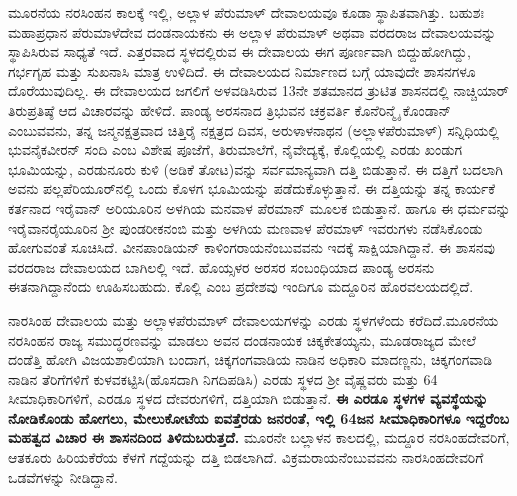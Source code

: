 ಮೂರನೆಯ ನರಸಿಂಹನ ಕಾಲಕ್ಕೆ ಇಲ್ಲಿ, ಅಲ್ಲಾಳ ಪೆರುಮಾಳ್​ ದೇವಾಲಯವೂ ಕೂಡಾ ಸ್ಥಾಪಿತವಾಗಿತ್ತು. ಬಹುಶಃ ಮಹಾಪ್ರಧಾನ ಪೆರುಮಾಳೆದೇವ ದಂಡನಾಯಕನು ಈ ಅಲ್ಲಾಳ ಪೆರುಮಾಳ್​ ಅಥವಾ ವರದರಾಜ ದೇವಾಲಯವನ್ನು ಸ್ಥಾಪಿಸಿರುವ ಸಾಧ್ಯತೆ ಇದೆ. ಎತ್ತರವಾದ ಸ್ಥಳದಲ್ಲಿರುವ ಈ ದೇವಾಲಯ ಈಗ ಪೂರ್ಣವಾಗಿ ಬಿದ್ದುಹೋಗಿದ್ದು, ಗರ್ಭಗೃಹ ಮತ್ತು ಸುಖನಾಸಿ ಮಾತ್ರ ಉಳಿದಿದೆ. ಈ ದೇವಾಲಯದ ನಿರ್ಮಾಣದ ಬಗ್ಗೆ ಯಾವುದೇ ಶಾಸನಗಳೂ ದೊರೆಯುವುದಿಲ್ಲ. ಈ ದೇವಾಲಯದ ಜಗಲಿಗೆ ಅಳವಡಿಸಿರುವ 13ನೇ ಶತಮಾನದ ತ್ರುಟಿತ ಶಾಸನದಲ್ಲಿ ನಾಚ್ಚಿಯಾರ್​ ತಿರುಪ್ರತಿಷ್ಠೆ ಆದ ವಿಚಾರವನ್ನು ಹೇಳಿದೆ. ಪಾಂಡ್ಯ ಅರಸನಾದ ತ್ರಿಭುವನ ಚಕ್ರವರ್ತಿ ಕೊನೆರಿನ್ಮೈ ಕೊಂಡಾನ್​ ಎಂಬುವವನು, ತನ್ನ ಜನ್ಮನಕ್ಷತ್ರವಾದ ಚಿತ್ತಿರೈ ನಕ್ಷತ್ರದ ದಿವಸ, ಅರುಳಾಳನಾಥನ (ಅಲ್ಲಾಳಪೆರುಮಾಳ್​) ಸನ್ನಿಧಿಯಲ್ಲಿ ಭುವನೈಕವೀರನ್​ ಸಂದಿ ಎಂಬ ವಿಶೇಷ ಪೂಜೆಗೆ, ತಿರುಮಾಲೆಗೆ, ನೈವೇದ್ಯಕ್ಕೆ, ಕೊಲ್ಲಿಯಲ್ಲಿ ಎರಡು ಖಂಡುಗ ಭೂಮಿಯನ್ನು, ಎರಡುನೂರು ಕುಳಿ (ಅಡಿಕೆ ತೋಟ)ವನ್ನು ಸರ್ವಮಾನ್ಯವಾಗಿ ದತ್ತಿ ಬಿಡುತ್ತಾನೆ. ಈ ದತ್ತಿಗೆ ಬದಲಾಗಿ ಅವನು ಪಲ್ಲಪೆರಿಯೂರ್​ನಲ್ಲಿ ಒಂದು ಕೊಳಗ ಭೂಮಿಯನ್ನು ಪಡೆದುಕೊಳ್ಳುತ್ತಾನೆ. ಈ ದತ್ತಿಯನ್ನು ತನ್ನ ಕಾರ್ಯಕೆ ಕರ್ತನಾದ ಇರೈವಾನ್​ ಅರಿಯೂರಿನ ಅಳಗಿಯ ಮನವಾಳ ಪೆರಮಾನ್​ ಮೂಲಕ ಬಿಡುತ್ತಾನೆ. ಹಾಗೂ ಈ ಧರ್ಮವನ್ನು ಇರೈವಾನರೈಯೂರಿನ ಶ‍್ರೀ ಪುಂಡರೀಕನಂಬಿ ಮತ್ತು ಅಳಗಿಯ ಮಣವಾಳ ಪೆರಮಾಳ್​ ಇವರುಗಳು ನಡೆಸಿಕೊಂಡು ಹೋಗುವಂತೆ ಸೂಚಿಸಿದೆ. ವೀನಪಾಂಡಿಯನ್​ ಕಾಳಿಂಗರಾಯನೆಂಬುವವನು ಇದಕ್ಕೆ ಸಾಕ್ಷಿಯಾಗಿದ್ದಾನೆ. ಈ ಶಾಸನವು ವರದರಾಜ ದೇವಾಲಯದ ಬಾಗಿಲಲ್ಲಿ ಇದೆ. ಹೊಯ್ಸಳರ ಅರಸರ ಸಂಬಂಧಿಯಾದ ಪಾಂಡ್ಯ ಅರಸನು ಈತನಾಗಿದ್ದಾನೆಂದು ಊಹಿಸಬಹುದು. ಕೊಲ್ಲಿ ಎಂಬ ಪ್ರದೇಶವು ಇಂದಿಗೂ ಮದ್ದೂರಿನ ಹೊರವಲಯ\-ದಲ್ಲಿದೆ.

\vskip -2pt

ನಾರಸಿಂಹ ದೇವಾಲಯ ಮತ್ತು ಅಲ್ಲಾಳಪೆರುಮಾಳ್​ ದೇವಾಲಯಗಳನ್ನು ಎರಡು ಸ್ಥಳಗಳೆಂದು ಕರೆದಿದೆ.\break ಮೂರನೆಯ ನರಸಿಂಹನ ರಾಜ್ಯ ಸಮುದ್ಧರಣವನ್ನು ಮಾಡಲು ಅವನ ದಂಡನಾಯಕ ಚಿಕ್ಕಕೇತಯ್ಯನು, ಮೂಡರಾಜ್ಯದ ಮೇಲೆ ದಂಡೆತ್ತಿ ಹೋಗಿ ವಿಜಯಶಾಲಿಯಾಗಿ ಬಂದಾಗ, ಚಿಕ್ಕಗಂಗವಾಡಿಯ ನಾಡಿನ ಅಧಿಕಾರಿ ಮಾದಣ್ಣನು, ಚಿಕ್ಕಗಂಗವಾಡಿ ನಾಡಿನ ತೆರಿಗೆಗಳಿಗೆ ಕುಳವಕಟ್ಟಿಸಿ(ಹೊಸದಾಗಿ ನಿಗದಿಪಡಿಸಿ) ಎರಡು ಸ್ಥಳದ ಶ‍್ರೀ ವೈಷ್ಣವರು ಮತ್ತು 64 ಸೀಮಾಧಿಕಾರಿಗಳಿಗೆ, ಎರಡೂ ಸ್ಥಳದ ದೇವರುಗಳಿಗೆ, ದತ್ತಿಯಾಗಿ ಬಿಡುತ್ತಾನೆ. \textbf{ಈ ಎರಡೂ ಸ್ಥಳಗಳ ವ್ಯವಸ್ಥೆಯನ್ನು ನೋಡಿಕೊಂಡು ಹೋಗಲು, ಮೇಲುಕೋಟೆಯ ಐವತ್ತೆರಡು ಜನರಂತೆ, ಇಲ್ಲಿ 64ಜನ ಸೀಮಾಧಿಕಾರಿಗಳೂ ಇದ್ದರೆಂಬ ಮಹತ್ವದ ವಿಚಾರ ಈ ಶಾಸನದಿಂದ ತಿಳಿದುಬರುತ್ತದೆ.} ಮೂರನೇ ಬಲ್ಲಾಳನ ಕಾಲದಲ್ಲಿ, ಮದ್ದೂರ ನರಸಿಂಹದೇವರಿಗೆ, ಆತಕೂರು ಹಿರಿಯಕೆರೆಯ ಕೆಳಗೆ ಗದ್ದೆಯನ್ನು ದತ್ತಿ ಬಿಡಲಾಗಿದೆ. ವಿಕ್ರಮರಾಯನೆಂಬುವವನು ನಾರಸಿಂಹದೇವರಿಗೆ ಒಡವೆಗಳನ್ನು ನೀಡಿದ್ದಾನೆ.

